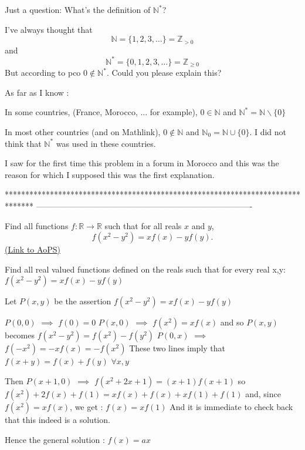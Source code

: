 \begin{solution}
	\begin{tcolorbox}Just a question:
What's the definition of $ \mathbb{N}^\ast$?

I've always thought that
\[ \mathbb{N} = \{ 1,2,3,\ldots \} = \mathbb{Z}_{ > 0}\]
and
\[ \mathbb{N}^\ast = \{ 0,1,2,3,\ldots \} = \mathbb{Z}_{\geq 0}\]
But according to pco $ 0 \not\in \mathbb{N}^\ast$. Could you please explain this?\end{tcolorbox}

As far as I know :

In some countries, (France, Morocco, ... for example), $ 0\in\mathbb N$ and $ \mathbb N^*=\mathbb N\backslash \{0\}$

In most other countries (and on Mathlink), $ 0\notin\mathbb N$ and $ \mathbb N_0=\mathbb N\cup\{0\}$. I did not think that $ \mathbb N^*$ was used in these countries.

I saw for the first time this problem in a forum in Morocco and this was the reason for which I supposed this was the first explanation.
\end{solution}
*******************************************************************************
-------------------------------------------------------------------------------

\begin{problem}
	Find all functions $f: \mathbb R \to \mathbb R$ such that for all reals $x$ and $y$, 
\[f(x^2-y^2)=xf(x)-yf(y).\]
	\flushright \href{https://artofproblemsolving.com/community/c6h320299}{(Link to AoPS)}
\end{problem}



\begin{solution}
	\begin{tcolorbox}Find all real valued functions defined on the reals such that for every real x,y: $ f(x^2 - y^2) = xf(x) - yf(y)$\end{tcolorbox}
Let $ P(x,y)$ be the assertion $ f(x^2-y^2)=xf(x)-yf(y)$

$ P(0,0)$ $ \implies$ $ f(0)=0$
$ P(x,0)$ $ \implies$ $ f(x^2)=xf(x)$ and so $ P(x,y)$ becomes $ f(x^2-y^2)=f(x^2)-f(y^2)$
$ P(0,x)$ $ \implies$ $ f(-x^2)=-xf(x)=-f(x^2)$ 
These two lines imply that $ f(x+y)=f(x)+f(y)$ $ \forall x,y$

Then $ P(x+1,0)$ $ \implies$ $ f(x^2+2x+1)=(x+1)f(x+1)$ so $ f(x^2)+2f(x)+f(1)=xf(x)+f(x)+xf(1)+f(1)$ and, since $ f(x^2)=xf(x)$, we get : $ f(x)=xf(1)$
And it is immediate to check back that this indeed is a solution.

Hence the general solution : $ \boxed{f(x)=ax}$
\end{solution}



